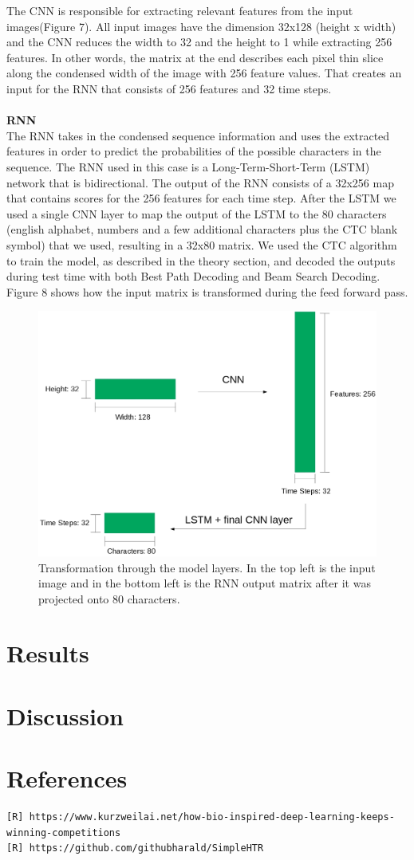 \documentclass{article}
\begin{document}
The CNN is responsible for extracting relevant features from the input images(Figure 7). All input images have the dimension 32x128 (height x width) and the CNN reduces the width to 32 and the height to 1 while extracting 256 features. In other words, the matrix at the end describes each pixel thin slice along the condensed width of the image with 256 feature values. That creates an input for the RNN that consists of 256 features and 32 time steps.\\\\
\textbf{RNN}\\
The RNN takes in the condensed sequence information and uses the extracted features in order to predict the probabilities of the possible characters in the sequence. The RNN used in this case is a Long-Term-Short-Term (LSTM) network that is bidirectional. The output of the RNN consists of a 32x256 map that contains scores for the 256 features for each time step. After the LSTM we used a single CNN layer to map the output of the LSTM to the 80 characters (english alphabet, numbers and a few additional characters plus the CTC blank symbol) that we used, resulting in a 32x80 matrix. We used the CTC algorithm to train the model, as described in the theory section, and decoded the outputs during test time with both Best Path Decoding and Beam Search Decoding. Figure 8 shows how the input matrix is transformed during the feed forward pass.
\begin{figure}[H]
\begin{center}
\includegraphics[scale=0.25]{rsz_pipeline}
\end{center}
\caption{Transformation through the model layers. In the top left is the input image and in the bottom left is the RNN output matrix after it was projected onto 80 characters.}
\end{figure}
\section{Results}

\section{Discussion}

\section{References}
\begin{verbatim}
[R] https://www.kurzweilai.net/how-bio-inspired-deep-learning-keeps-winning-competitions
[R] https://github.com/githubharald/SimpleHTR
\end{verbatim}
\end{document}
